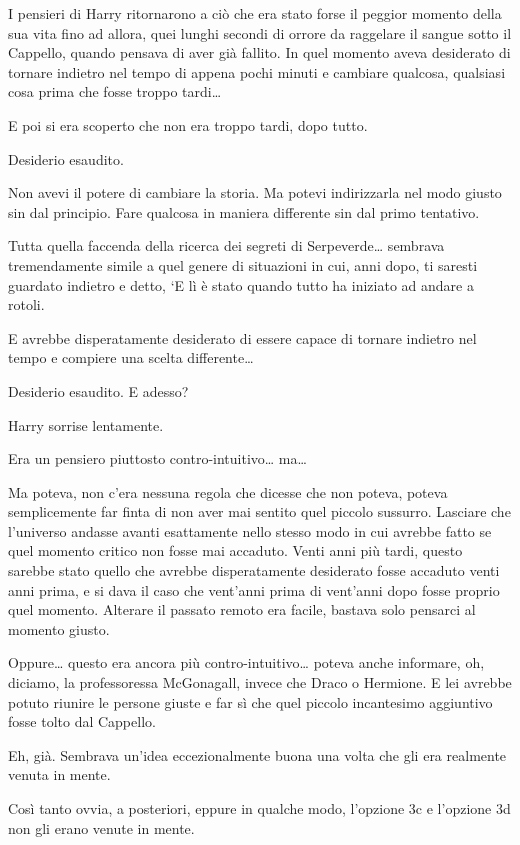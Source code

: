 I pensieri di Harry ritornarono a ciò che era stato forse il peggior momento della sua vita fino ad allora, quei lunghi secondi di orrore da raggelare il sangue sotto il Cappello, quando pensava di aver già fallito. In quel momento aveva desiderato di tornare indietro nel tempo di appena pochi minuti e cambiare qualcosa, qualsiasi cosa prima che fosse troppo tardi…

E poi si era scoperto che non era troppo tardi, dopo tutto.

Desiderio esaudito.

Non avevi il potere di cambiare la storia. Ma potevi indirizzarla nel modo giusto sin dal principio. Fare qualcosa in maniera differente sin dal primo tentativo.

Tutta quella faccenda della ricerca dei segreti di Serpeverde… sembrava tremendamente simile a quel genere di situazioni in cui, anni dopo, ti saresti guardato indietro e detto, ‘E lì è stato quando tutto ha iniziato ad andare a rotoli.

E avrebbe disperatamente desiderato di essere capace di tornare indietro nel tempo e compiere una scelta differente…

Desiderio esaudito. E adesso?

Harry sorrise lentamente.

Era un pensiero piuttosto contro-intuitivo… ma…

Ma poteva, non c’era nessuna regola che dicesse che non poteva, poteva semplicemente far finta di non aver mai sentito quel piccolo sussurro. Lasciare che l’universo andasse avanti esattamente nello stesso modo in cui avrebbe fatto se quel momento critico non fosse mai accaduto. Venti anni più tardi, questo sarebbe stato quello che avrebbe disperatamente desiderato fosse accaduto venti anni prima, e si dava il caso che vent’anni prima di vent’anni dopo fosse proprio quel momento. Alterare il passato remoto era facile, bastava solo pensarci al momento giusto.

Oppure… questo era ancora più contro-intuitivo… poteva anche informare, oh, diciamo, la professoressa McGonagall, invece che Draco o Hermione. E lei avrebbe potuto riunire le persone giuste e far sì che quel piccolo incantesimo aggiuntivo fosse tolto dal Cappello.

Eh, già. Sembrava un’idea eccezionalmente buona una volta che gli era realmente venuta in mente.

Così tanto ovvia, a posteriori, eppure in qualche modo, l’opzione 3c e l’opzione 3d non gli erano venute in mente.

